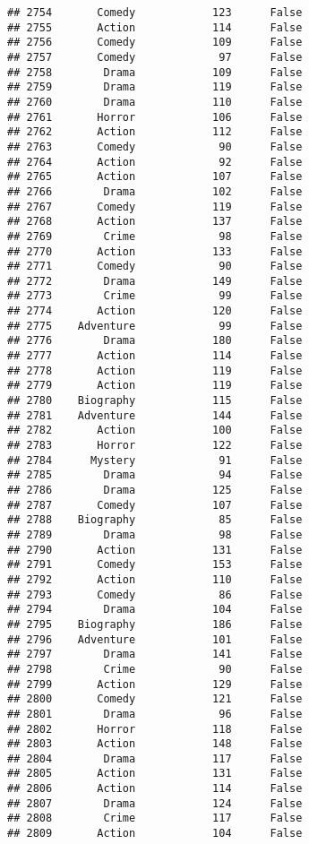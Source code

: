 \documentclass[
]{article}
\begin{document}
\begin{verbatim}
## 2754       Comedy            123      False
## 2755       Action            114      False
## 2756       Comedy            109      False
## 2757       Comedy             97      False
## 2758        Drama            109      False
## 2759        Drama            119      False
## 2760        Drama            110      False
## 2761       Horror            106      False
## 2762       Action            112      False
## 2763       Comedy             90      False
## 2764       Action             92      False
## 2765       Action            107      False
## 2766        Drama            102      False
## 2767       Comedy            119      False
## 2768       Action            137      False
## 2769        Crime             98      False
## 2770       Action            133      False
## 2771       Comedy             90      False
## 2772        Drama            149      False
## 2773        Crime             99      False
## 2774       Action            120      False
## 2775    Adventure             99      False
## 2776        Drama            180      False
## 2777       Action            114      False
## 2778       Action            119      False
## 2779       Action            119      False
## 2780    Biography            115      False
## 2781    Adventure            144      False
## 2782       Action            100      False
## 2783       Horror            122      False
## 2784      Mystery             91      False
## 2785        Drama             94      False
## 2786        Drama            125      False
## 2787       Comedy            107      False
## 2788    Biography             85      False
## 2789        Drama             98      False
## 2790       Action            131      False
## 2791       Comedy            153      False
## 2792       Action            110      False
## 2793       Comedy             86      False
## 2794        Drama            104      False
## 2795    Biography            186      False
## 2796    Adventure            101      False
## 2797        Drama            141      False
## 2798        Crime             90      False
## 2799       Action            129      False
## 2800       Comedy            121      False
## 2801        Drama             96      False
## 2802       Horror            118      False
## 2803       Action            148      False
## 2804        Drama            117      False
## 2805       Action            131      False
## 2806       Action            114      False
## 2807        Drama            124      False
## 2808        Crime            117      False
## 2809       Action            104      False

\end{verbatim}
\end{document}
